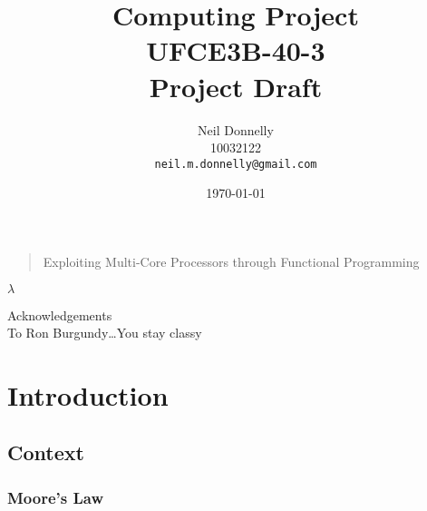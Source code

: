 \documentclass[12pt,a4paper]{article}
\title{Computing Project\\UFCE3B-40-3\\Project Draft}
\author{Neil Donnelly\\10032122\\
\texttt{neil.m.donnelly@gmail.com}
}
\date{\today}
\begin{document}
\maketitle
\thispagestyle{empty}

\begin{quote}
    \begin{center}\Large Exploiting Multi-Core Processors through Functional Programming
    \end{center}
\end{quote}
    \begin{center}
        {\fontsize{50}{60}\selectfont $\lambda$}
    \end{center}
\newpage

\doublespacing
\pagestyle{empty}

\vspace*{\fill}
    \begin{center}
        \Large Acknowledgements \\
        \large
        To Ron Burgundy\ldots You stay classy\\
    \end{center}
\vspace*{\fill}
\newpage

\begin{abstract}
\lipsum[1-2]
\end{abstract}
\newpage

\pagestyle{plain}
\setcounter{page}{1}
\tableofcontents

\newpage

\pagestyle{plain}
\setcounter{page}{1}

\doublespacing

\renewcommand{\harvardand}{\&}

\section{Introduction}
\subsection{Context}
\subsubsection{Moore's Law}
\end{document}
